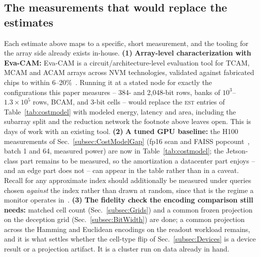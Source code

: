 \subsection{The measurements that would replace the estimates}
\label{subsec:NextMeasurements}
Each estimate above maps to a specific, short measurement, and the
tooling for the array side already exists in-house.
{\bf (1)} \textbf{Array-level characterization with Eva-CAM:} Eva-CAM
is a circuit/architecture-level evaluation tool for TCAM, MCAM and
ACAM arrays across NVM technologies, validated against fabricated
chips to within 6--20\%~\cite{liu2022evacam}. Running it at a stated
node for exactly the configurations this paper measures -- 384- and
2{,}048-bit rows, banks of $10^{3}$--$1.3\!\times\!10^{5}$ rows, BCAM,
\tcam and 3-bit \mcam cells -- would replace the \textsc{est} entries
of Table~\ref{tab:costmodel} with modeled energy, latency and area,
including the subarray split and the reduction network the footnote
above leaves open. This is days of work with an existing tool.
{\bf (2)} \textbf{A tuned GPU baseline:} the H100 measurements of
Sec.~\ref{subsec:CostModelGap} (fp16 scan and FAISS
popcount~\cite{faisscuvs2025}, batch 1 and 64, measured power) are now
in Table~\ref{tab:costmodel}; the Jetson-class part remains to be
measured, so the amortization a datacenter part enjoys -- and an edge
part does not -- can appear in the table rather than in a caveat. Recall
for any approximate index should additionally be measured under
queries chosen \emph{against} the index rather than drawn at random,
since that is the regime a monitor operates
in~\cite{andoni2026robustann}.
{\bf (3)} \textbf{The fidelity check the encoding comparison still
needs:} matched cell count (Sec.~\ref{subsec:Grids}) and a common
frozen projection on the deception grid (Sec.~\ref{subsec:BitWidth})
are done; a common projection across the Hamming and Euclidean
encodings on the readout workload remains, and it is what settles
whether the cell-type flip of Sec.~\ref{subsec:Devices} is a device
result or a projection artifact. It is a cluster run on data already
in hand.

